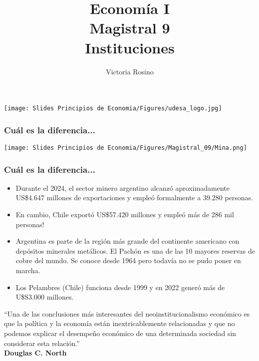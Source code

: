 \documentclass{beamer}
\title[Economía I]{Economía I \vspace{3mm}
\\ Magistral 9 \vspace{3mm} \\ Instituciones}
\date{}
\author[Victoria Rosino]{Victoria Rosino}
\institute[]{Universidad de San Andrés}
\begin{document}
\begin{frame}
\vspace{0.3cm}
\titlepage
\centering
\vspace{-0.9cm}
\texttt{[image: Slides Principios de Economia/Figures/udesa\_logo.jpg]} 
\end{frame}

\begin{frame}
\frametitle{Cuál es la diferencia...}
\centering
\texttt{[image: Slides Principios de Economia/Figures/Magistral\_09/Mina.png]}
\end{frame}

\begin{frame}
\frametitle{Cuál es la diferencia...}
\begin{itemize}
    \item Durante el 2024, el sector minero argentino alcanzó aproximadamente US\$4.647 millones de exportaciones y empleó formalmente a 39.280 personas.
    \item En cambio, Chile exportó US\$57.420 millones y empleó más de 286 mil personas!
    \item  Argentina es parte de la región más grande del continente americano con depósitos minerales metálicos. El Pachón es una de las 10 mayores reservas de cobre del mundo. Se conoce desde 1964 pero todavía no se pudo poner en marcha.
    \item Los Pelambres (Chile) funciona desde 1999 y en 2022 generó más de U\$S3.000 millones.
\end{itemize}
\end{frame}

\begin{frame}
\centering
\begin{boxB}
“Una de las conclusiones más interesantes del neoinstitucionalismo económico es que la política y la economía están inextricablemente relacionadas y que no podemos explicar el desempeño económico de una determinada sociedad sin considerar esta relación.” \\
\centering \textbf{Douglas C. North}
\end{boxB}
\end{frame}
\end{document}
